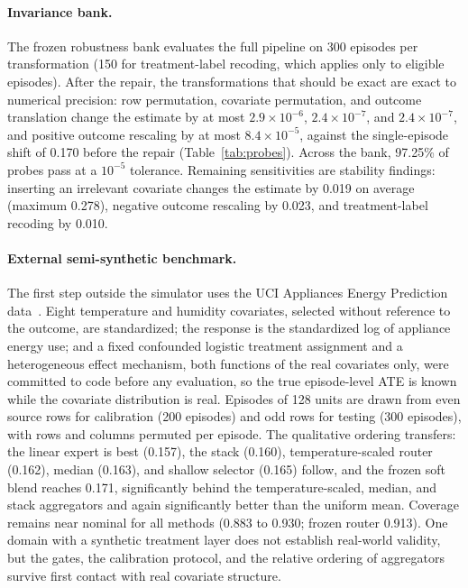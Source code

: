 \documentclass[electronics,article,submit,oneauthor]{Definitions/mdpi}
\begin{document}
\paragraph{Invariance bank.} The frozen robustness bank evaluates the full pipeline on 300 episodes per transformation (150 for treatment-label recoding, which applies only to eligible episodes). After the repair, the transformations that should be exact are exact to numerical precision: row permutation, covariate permutation, and outcome translation change the estimate by at most $2.9\times10^{-6}$, $2.4\times10^{-7}$, and $2.4\times10^{-7}$, and positive outcome rescaling by at most $8.4\times10^{-5}$, against the single-episode shift of 0.170 before the repair (Table~\ref{tab:probes}). Across the bank, 97.25\% of probes pass at a $10^{-5}$ tolerance. Remaining sensitivities are stability findings: inserting an irrelevant covariate changes the estimate by 0.019 on average (maximum 0.278), negative outcome rescaling by 0.023, and treatment-label recoding by 0.010.

\paragraph{External semi-synthetic benchmark.} The first step outside the simulator uses the UCI Appliances Energy Prediction data~\cite{candanedo2017appliances}. Eight temperature and humidity covariates, selected without reference to the outcome, are standardized; the response is the standardized log of appliance energy use; and a fixed confounded logistic treatment assignment and a heterogeneous effect mechanism, both functions of the real covariates only, were committed to code before any evaluation, so the true episode-level ATE is known while the covariate distribution is real. Episodes of 128 units are drawn from even source rows for calibration (200 episodes) and odd rows for testing (300 episodes), with rows and columns permuted per episode. The qualitative ordering transfers: the linear expert is best (0.157), the stack (0.160), temperature-scaled router (0.162), median (0.163), and shallow selector (0.165) follow, and the frozen soft blend reaches 0.171, significantly behind the temperature-scaled, median, and stack aggregators and again significantly better than the uniform mean. Coverage remains near nominal for all methods (0.883 to 0.930; frozen router 0.913). One domain with a synthetic treatment layer does not establish real-world validity, but the gates, the calibration protocol, and the relative ordering of aggregators survive first contact with real covariate structure.
\end{document}
